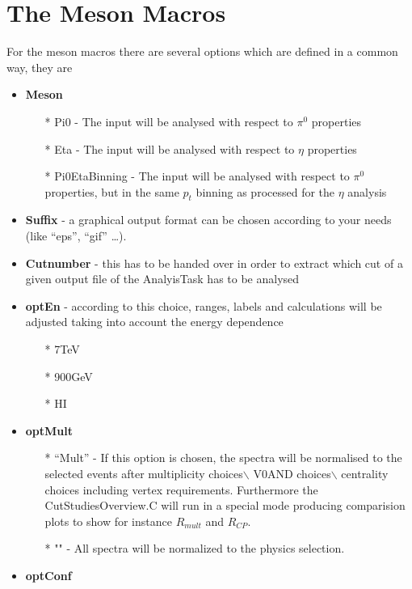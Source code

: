 	\section{The Meson Macros}
		For the meson macros there are several options which are defined in a common way, they are
			\begin{itemize}
			 \item \textbf{Meson}
				\begin{itemize}
				 \item [*] Pi0		- The input will be analysed with respect to $\pi^0$ properties
				 \item [*] Eta		- The input will be analysed with respect to $\eta$ properties
				 \item [*] Pi0EtaBinning - The input will be analysed with respect to $\pi^0$ properties, but in the same $p_t$ binning as processed for the $\eta$ analysis
				\end{itemize}
			 \item \textbf{Suffix} 	- a graphical output format can be chosen according to your needs (like ``eps'', ``gif'' \ldots).
			 \item \textbf{Cutnumber} - this has to be handed over in order to extract which cut of a given output file of the AnalyisTask has to be analysed
			 \item \textbf{optEn}   - according to this choice, ranges, labels and calculations will be adjusted taking into account the energy dependence
				\begin{itemize}
				 \item [*] 7TeV		
				 \item [*] 900GeV	
				 \item [*] HI
				\end{itemize} 
 			 \item \textbf{optMult}
				\begin{itemize}
				\item [*] ``Mult''  - If this option is chosen, the spectra will be normalised to the selected events after multiplicity choices$\backslash$ V0AND choices$\backslash$ centrality choices including vertex requirements. Furthermore the CutStudiesOverview.C will run in a special mode producing comparision plots to show for instance $R_{mult}$ and $R_{CP}$. 
				\item [*] ""	- All spectra will be normalized to the physics selection.
				\end{itemize}
			 \item \textbf{optConf}
				\begin{itemize}

\end{itemize}
\end{itemize}
